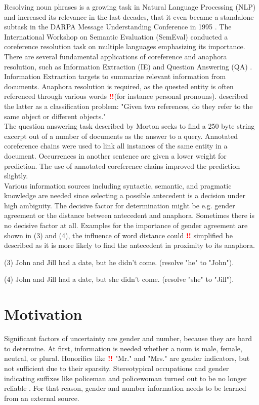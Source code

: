 Resolving noun phrases is a growing task in Natural Language Processing (NLP) and increased its relevance in the last decades, that it even became a standalone subtask in the DARPA Message Understanding Conference in 1995 \citep{chinchor1995message}. The International Workshop on Semantic Evaluation (SemEval) conducted a coreference resolution task on multiple languages \citep{recasens2010semeval} emphasizing its importance. 
There are several fundamental applications of coreference and anaphora resolution, such as Information Extraction (IE) \citep{mccarthy1995using} and Question Answering (QA) \citep{morton2000coreference}.\\ 
Information Extraction targets to summarize relevant information from documents. Anaphora resolution is required, as the quested entity is often referenced through various words \textcolor{red}{\textbf{!!}}(for instance personal pronouns). \citep{mccarthy1995using} described the latter as a classification problem: "Given two references, do they refer to the same object or different objects."\\
The question answering task described by Morton seeks to find a 250 byte string excerpt out of a number of documents as the answer to a query. Annotated coreference chains were used to link all instances of the same entity in a document. Occurrences in another sentence are given a lower weight for prediction. The use of annotated coreference chains improved the prediction slightly.\\

Various information sources including syntactic, semantic, and pragmatic knowledge are needed since selecting a possible antecedent is a decision under high ambiguity. The decisive factor for determination might be e.g. gender agreement or the distance between antecedent and anaphora. Sometimes there is no decisive factor at all. Examples for the importance of gender agreement are shown in (3) and (4), the influence of word distance could \textcolor{red}{\textbf{!!}} simplified be described as it is more likely to find the antecedent in proximity to its anaphora.

(3) John and Jill had a date, but he didn't come. (resolve "he" to "John").

(4) John and Jill had a date, but she didn't come. (resolve "she" to "Jill").


\section{Motivation}
Significant factors of uncertainty are gender and number, because they are hard to determine. At first, information is needed whether a noun is male, female, neutral, or plural. Honorifics like \textcolor{red}{\textbf{!!}} "Mr." and "Mrs." are gender indicators, but not sufficient due to their sparsity. Stereotypical occupations and gender indicating suffixes like policeman and policewoman turned out to be no longer reliable \citep{evans2000improving}. For that reason, gender and number information needs to be learned from an external source. 


